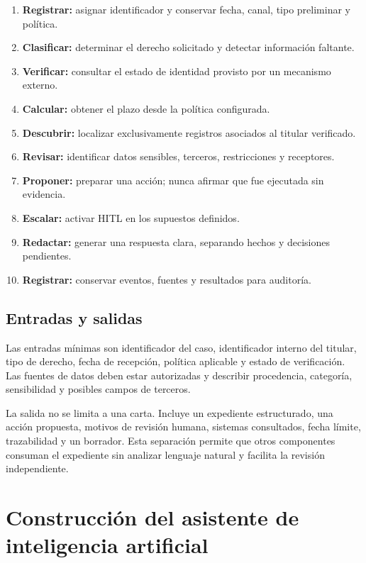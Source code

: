 \documentclass[11pt,a4paper]{article}
\begin{document}
\begin{enumerate}[label=\textbf{P\arabic*.},leftmargin=1.7cm]
  \item \textbf{Registrar:} asignar identificador y conservar fecha, canal, tipo preliminar y política.
  \item \textbf{Clasificar:} determinar el derecho solicitado y detectar información faltante.
  \item \textbf{Verificar:} consultar el estado de identidad provisto por un mecanismo externo.
  \item \textbf{Calcular:} obtener el plazo desde la política configurada.
  \item \textbf{Descubrir:} localizar exclusivamente registros asociados al titular verificado.
  \item \textbf{Revisar:} identificar datos sensibles, terceros, restricciones y receptores.
  \item \textbf{Proponer:} preparar una acción; nunca afirmar que fue ejecutada sin evidencia.
  \item \textbf{Escalar:} activar HITL en los supuestos definidos.
  \item \textbf{Redactar:} generar una respuesta clara, separando hechos y decisiones pendientes.
  \item \textbf{Registrar:} conservar eventos, fuentes y resultados para auditoría.
\end{enumerate}

\subsection{Entradas y salidas}

Las entradas mínimas son identificador del caso, identificador interno del titular, tipo de derecho, fecha de recepción, política aplicable y estado de verificación. Las fuentes de datos deben estar autorizadas y describir procedencia, categoría, sensibilidad y posibles campos de terceros.

La salida no se limita a una carta. Incluye un expediente estructurado, una acción propuesta, motivos de revisión humana, sistemas consultados, fecha límite, trazabilidad y un borrador. Esta separación permite que otros componentes consuman el expediente sin analizar lenguaje natural y facilita la revisión independiente.

\section{Construcción del asistente de inteligencia artificial}
\end{document}
